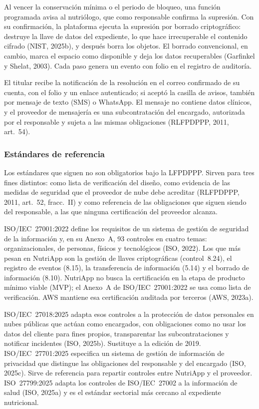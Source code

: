 \documentclass[12pt, a4paper]{article}
\begin{document}
Al vencer la conservación mínima o el periodo de bloqueo, una
función programada avisa al nutriólogo, que como responsable
confirma la supresión. Con su confirmación, la plataforma ejecuta
la supresión por borrado criptográfico: destruye la llave de datos
del expediente, lo que hace irrecuperable el contenido cifrado
(NIST, 2025b), y después borra los objetos. El borrado
convencional, en cambio, marca el espacio como disponible y deja
los datos recuperables (Garfinkel y Shelat, 2003). Cada paso
genera un evento con folio en el registro de auditoría.
 
El titular recibe la notificación de la resolución en el correo
confirmado de su cuenta, con el folio y un enlace autenticado; si
aceptó la casilla de avisos, también por mensaje de texto (SMS) o WhatsApp. El mensaje
no contiene datos clínicos, y el proveedor de mensajería es una
subcontratación del encargado, autorizada por el responsable y sujeta
a las mismas obligaciones (RLFPDPPP, 2011, art.~54).
 
\subsubsection{Estándares de referencia}
 
Los estándares que siguen no son obligatorios bajo la LFPDPPP.
Sirven para tres fines distintos: como lista de verificación del
diseño, como evidencia de las medidas de seguridad que el
proveedor de nube debe acreditar (RLFPDPPP, 2011, art.~52,
fracc.~II) y como referencia de las obligaciones que siguen siendo
del responsable, a las que ninguna certificación del proveedor
alcanza.
 
ISO/IEC~27001:2022 define los requisitos de un sistema de gestión
de seguridad de la información y, en su Anexo~A, 93 controles en
cuatro temas: organizacionales, de personas, físicos y
tecnológicos (ISO, 2022). Los que más pesan en NutriApp son la
gestión de llaves criptográficas (control~8.24), el registro de
eventos (8.15), la transferencia de información (5.14) y el borrado
de información (8.10). NutriApp no busca la certificación en la
etapa de producto mínimo viable (MVP); el Anexo~A de ISO/IEC~27001:2022 se usa como lista
de verificación. AWS mantiene esa certificación auditada por
terceros (AWS, 2023a).
 
ISO/IEC~27018:2025 adapta esos controles a la protección de datos
personales en nubes públicas que actúan como encargados, con
obligaciones como no usar los datos del cliente para fines propios,
transparentar las subcontrataciones y notificar incidentes (ISO,
2025b). Sustituye a la edición de 2019. ISO/IEC~27701:2025
especifica un sistema de gestión de información de privacidad que
distingue las obligaciones del responsable y del encargado (ISO,
2025c). Sirve de referencia para repartir controles entre NutriApp
y el proveedor. ISO~27799:2025 adapta los controles
de ISO/IEC~27002 a la información de salud (ISO, 2025a) y es el
estándar sectorial más cercano al expediente nutricional.
 
\end{document}
